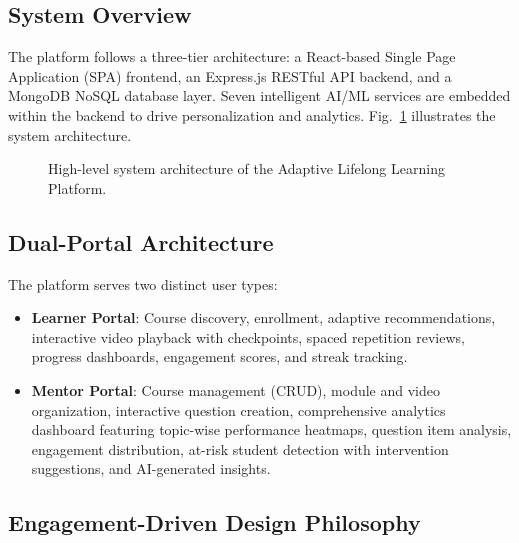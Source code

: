 \documentclass[conference]{IEEEtran}
\begin{document}
\subsection{System Overview}

The platform follows a three-tier architecture: a React-based Single Page Application (SPA) frontend, an Express.js RESTful API backend, and a MongoDB NoSQL database layer. Seven intelligent AI/ML services are embedded within the backend to drive personalization and analytics. Fig.~\ref{fig:system_arch} illustrates the system architecture.

\begin{figure}[htbp]
\centerline{}
\caption{High-level system architecture of the Adaptive Lifelong Learning Platform.}
\label{fig:system_arch}
\end{figure}

\subsection{Dual-Portal Architecture}

The platform serves two distinct user types:

\begin{itemize}
    \item \textbf{Learner Portal}: Course discovery, enrollment, adaptive recommendations, interactive video playback with checkpoints, spaced repetition reviews, progress dashboards, engagement scores, and streak tracking.
    \item \textbf{Mentor Portal}: Course management (CRUD), module and video organization, interactive question creation, comprehensive analytics dashboard featuring topic-wise performance heatmaps, question item analysis, engagement distribution, at-risk student detection with intervention suggestions, and AI-generated insights.
\end{itemize}

\subsection{Engagement-Driven Design Philosophy}
\end{document}
